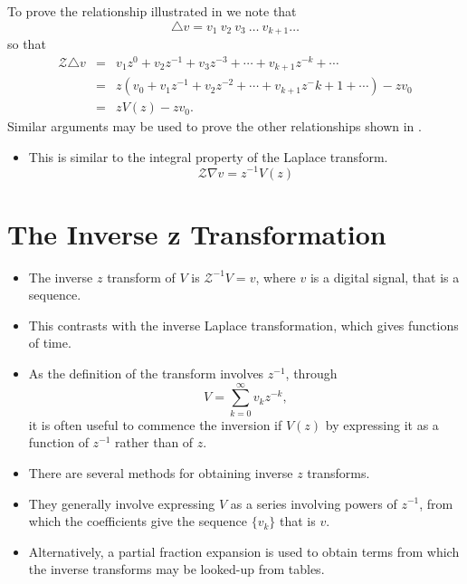 To prove the relationship illustrated in  we note
that
\[\triangle v = v_1\ v_2\ v_3\ \ldots\ v_{k+1}\ldots\]
so that
\begin{eqnarray*}
  \mathcal{Z}\triangle v & = & v_1 z^0 + v_2 z^{-1} + v_3 z^{-3} + \cdots
  + v_{k+1}z^{-k}+\cdots \\
& = & z(v_0 + v_1 z^{-1} + v_2 z^{-2} + \cdots
  + v_{k+1}z^-{k+1}+\cdots)-zv_0\\
&=& zV(z) - zv_0.
\end{eqnarray*}
Similar arguments may be used to prove the other relationships
shown in .

\begin{slide}\label{slide:l8s3}
\begin{itemize}
\item  This is similar to the integral property of the Laplace
   transform.
  \[\mathcal{Z}\nabla v = z^{-1} V(z)\]
\end{itemize}

\end{slide}

\section*{The Inverse z Transformation}
\begin{slide}\label{slide:l8s4}
   \begin{itemize}
   \item The inverse $z$ transform of $V$ is $\mathcal{Z}^{-1} V = v$,
     where $v$ is a digital signal, that is a sequence.
   \item This contrasts with the inverse Laplace transformation, which
     gives functions of time.
   \item As the definition of the transform involves $z^{-1}$, through
     \[V=\sum_{k=0}^{\infty} v_k z^{-k},\] it is often useful to
     commence the inversion if $V(z)$ by expressing it as a function of
     $z^{-1}$ rather than of $z$.
   \end{itemize}
\end{slide}

\begin{slide}\label{slide:l8s5}
   \begin{itemize}
   \item There are several methods for obtaining inverse $z$
     transforms.
   \item They generally involve expressing $V$ as a series involving
     powers of $z^{-1}$, from which the coefficients give the sequence
     $\{v_k\}$ that is $v$.
   \item Alternatively, a partial fraction expansion is used to obtain
     terms from which the inverse transforms may be looked-up from tables.
   \end{itemize}
\end{slide}

